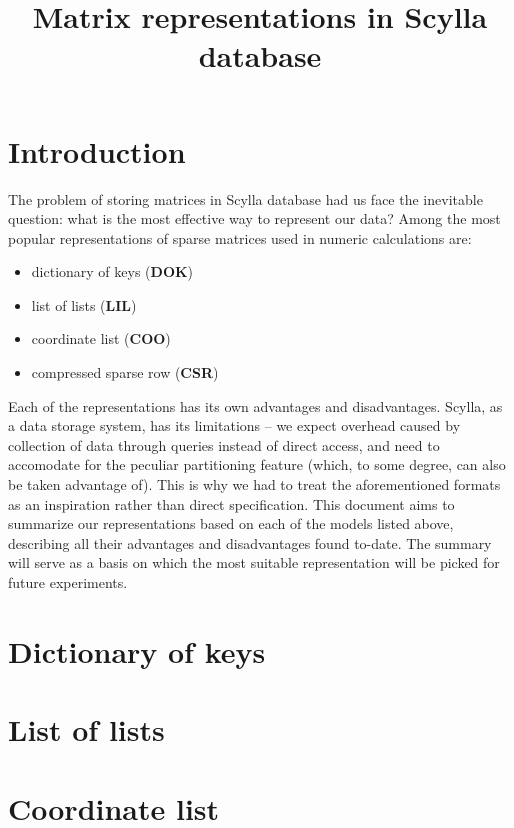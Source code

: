 \documentclass{article}
\begin{document}
\thispagestyle{empty}\phantom{m} \vspace{4em}

\title{Matrix representations in Scylla database}
\date{}
\author{}
\maketitle

\section{Introduction}
The problem of storing matrices in Scylla database had us face the inevitable question: what is the most effective way to represent our data? 
Among the most popular representations of sparse matrices used in numeric calculations are:
\begin{itemize}
\item dictionary of keys (\textbf{DOK})
\item list of lists (\textbf{LIL})
\item coordinate list (\textbf{COO})
\item compressed sparse row (\textbf{CSR})
\end{itemize}
Each of the representations has its own advantages and disadvantages. Scylla, as a data storage system, has its limitations – we expect overhead caused by collection of data through queries instead of direct access, and need to accomodate for the peculiar partitioning feature (which, to some degree, can also be taken advantage of). This is why we had to treat the aforementioned formats as an inspiration rather than direct specification. This document aims to summarize our representations based on each of the models listed above, describing all their advantages and disadvantages found to-date. The summary will serve as a basis on which the most suitable representation will be picked for future experiments.

\pagebreak
\section{Dictionary of keys}

\pagebreak
\section{List of lists}

\pagebreak
\section{Coordinate list}
\end{document}
